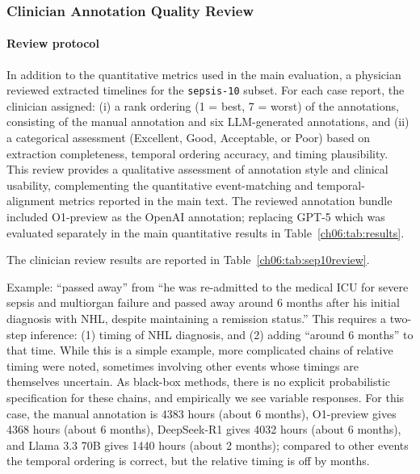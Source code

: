\subsubsection{Clinician Annotation Quality Review}
\label{ch06:apd:clinician_quality_review}

\ChSixHeadingOnly
\paragraph{Review protocol}

In addition to the quantitative metrics used in the main evaluation, a physician reviewed extracted timelines for the \texttt{sepsis-10} subset.
For each case report, the clinician assigned: (i) a rank ordering (1 = best, 7 = worst) of the annotations, consisting of the manual annotation and six LLM-generated annotations, and (ii) a categorical assessment (Excellent, Good, Acceptable, or Poor) based on extraction completeness, temporal ordering accuracy, and timing plausibility.
This review provides a qualitative assessment of annotation style and clinical usability, complementing the quantitative event-matching and temporal-alignment metrics reported in the main text.
The reviewed annotation bundle included O1-preview as the OpenAI annotation; replacing GPT-5 which was evaluated separately in the main quantitative results in Table~\ref{ch06:tab:results}.

The clinician review results are reported in Table~\ref{ch06:tab:sep10review}.

Example: ``passed away'' from ``he was re-admitted to the medical ICU for severe sepsis and multiorgan failure and passed away around 6 months after his initial diagnosis with NHL, despite maintaining a remission status.''
This requires a two-step inference: (1) timing of NHL diagnosis, and (2) adding ``around 6 months'' to that time.
While this is a simple example, more complicated chains of relative timing were noted, sometimes involving other events whose timings are themselves uncertain.
As black-box methods, there is no explicit probabilistic specification for these chains, and empirically we see variable responses.
For this case, the manual annotation is 4383 hours (about 6 months), O1-preview gives 4368 hours (about 6 months), DeepSeek-R1 gives 4032 hours (about 6 months), and Llama 3.3 70B gives 1440 hours (about 2 months); compared to other events the temporal ordering is correct, but the relative timing is off by months.

